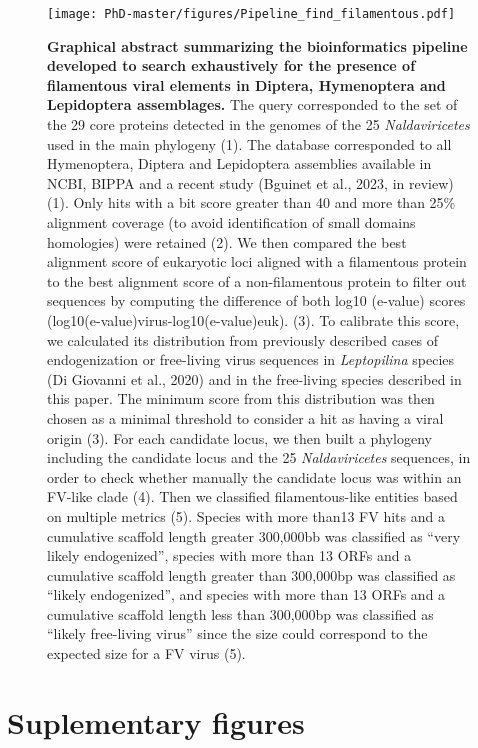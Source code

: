  \begin{figure}[!htpbt]
\texttt{[image: PhD-master/figures/Pipeline\_find\_filamentous.pdf]}\centering
\caption[Paper2:Graphical abstract of the pipeline to scan genomes for filamentous viruses]{\scriptsize\textbf{Graphical abstract summarizing the bioinformatics pipeline developed to search exhaustively for the presence of filamentous viral elements in Diptera, Hymenoptera and Lepidoptera assemblages.} The query corresponded to the set of the 29 core proteins detected in the genomes of the 25 \textit{Naldaviricetes} used in the main phylogeny (1). The database corresponded to all Hymenoptera, Diptera and Lepidoptera assemblies available in NCBI, BIPPA and a recent study (Bguinet et al., 2023, in review)(1). Only hits with a bit score greater than 40 and more than 25\% alignment coverage (to avoid identification of small domains homologies) were retained (2). We then compared the best alignment score of eukaryotic loci aligned with a filamentous protein to the best alignment score of a non-filamentous protein to filter out sequences by computing the difference of both log10 (e-value) scores (log10(e-value)virus-log10(e-value)euk). (3). To calibrate this score, we calculated its distribution from previously described cases of endogenization or free-living virus sequences in \textit{Leptopilina} species (Di Giovanni et al., 2020) and in the free-living species described in this paper. The minimum score from this distribution was then chosen as a minimal threshold to consider a hit as having a viral origin (3). For each candidate locus, we then built a phylogeny including the candidate locus and the 25 \textit{Naldaviricetes} sequences, in order to check whether manually the candidate locus was within an FV-like clade (4). Then we classified filamentous-like entities based on multiple metrics (5). Species with more than13 FV hits and a cumulative scaffold length greater 300,000bb was classified as “very likely endogenized”, species with more than 13 ORFs and a cumulative scaffold length greater than 300,000bp was classified as “likely endogenized”, and species with more than 13 ORFs and a cumulative scaffold length less than 300,000bp was classified as “likely free-living virus” since the size could correspond to the expected size for a FV virus (5).}
\label{figure:Pipeline_find_filamentous}
\end{figure}


\section{Suplementary figures}

